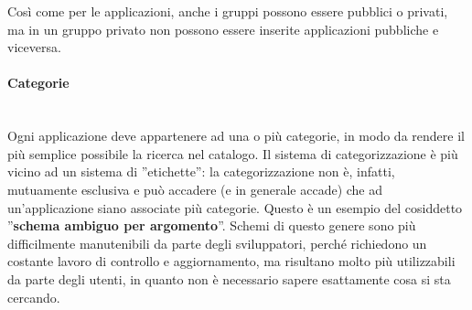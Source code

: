 Così come per le applicazioni, anche i gruppi possono essere pubblici o privati, ma in un gruppo privato non possono essere inserite applicazioni pubbliche e viceversa.

\paragraph{Categorie} \mbox{} \\
Ogni applicazione deve appartenere ad una o più categorie, in modo da rendere il più semplice possibile la ricerca nel catalogo. Il sistema di categorizzazione è più vicino ad un sistema di ''etichette'': la categorizzazione non è, infatti, mutuamente esclusiva e può accadere (e in generale accade) che ad un'applicazione siano associate più categorie. Questo è un esempio del cosiddetto ''\textbf{schema ambiguo per argomento}''. Schemi di questo genere sono più difficilmente manutenibili da parte degli sviluppatori, perché richiedono un costante lavoro di controllo e aggiornamento, ma risultano molto più utilizzabili da parte degli utenti, in quanto non è necessario sapere esattamente cosa si sta cercando. 

